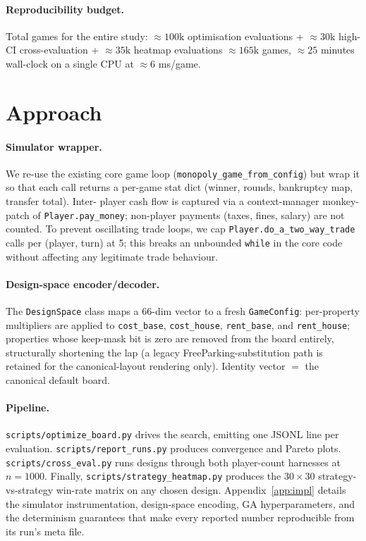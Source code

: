 \documentclass[10pt]{article}
\begin{document}
\paragraph{Reproducibility budget.} Total games for the entire study:
$\approx 100\text{k}$ optimisation evaluations + $\approx 30\text{k}$
high-CI cross-evaluation + $\approx 35\text{k}$ heatmap evaluations
$\approx 165\text{k}$ games, $\approx 25$ minutes wall-clock on a single
CPU at $\approx 6$ ms/game.

\section{Approach}

\paragraph{Simulator wrapper.} We re-use the existing core game loop
(\texttt{monopoly\_game\_from\_config}) but wrap it so that each call returns
a per-game stat dict (winner, rounds, bankruptcy map, transfer total). Inter-
player cash flow is captured via a context-manager monkey-patch of
\texttt{Player.pay\_money}; non-player payments (taxes, fines, salary) are
not counted. To prevent oscillating trade loops, we cap
\texttt{Player.do\_a\_two\_way\_trade} calls per (player, turn) at 5; this
breaks an unbounded \texttt{while} in the core code without affecting any
legitimate trade behaviour.

\paragraph{Design-space encoder/decoder.} The \texttt{DesignSpace} class
maps a 66-dim vector to a fresh \texttt{GameConfig}: per-property
multipliers are applied to \texttt{cost\_base},
\texttt{cost\_house}, \texttt{rent\_base}, and \texttt{rent\_house};
properties whose keep-mask bit is zero are removed from the board
entirely, structurally shortening the lap (a legacy
FreeParking-substitution path is retained for the canonical-layout
rendering only). Identity vector $=$ the canonical default board.

\paragraph{Pipeline.} \texttt{scripts/optimize\_board.py} drives the search,
emitting one JSONL line per evaluation. \texttt{scripts/report\_runs.py}
produces convergence and Pareto plots. \texttt{scripts/cross\_eval.py} runs
designs through both player-count harnesses at $n{=}1000$. Finally,
\texttt{scripts/strategy\_heatmap.py} produces the $30{\times}30$
strategy-vs-strategy win-rate matrix on any chosen design.
Appendix~\ref{app:impl} details the simulator instrumentation,
design-space encoding, GA hyperparameters, and the determinism guarantees
that make every reported number reproducible from its run's meta file.
\end{document}
